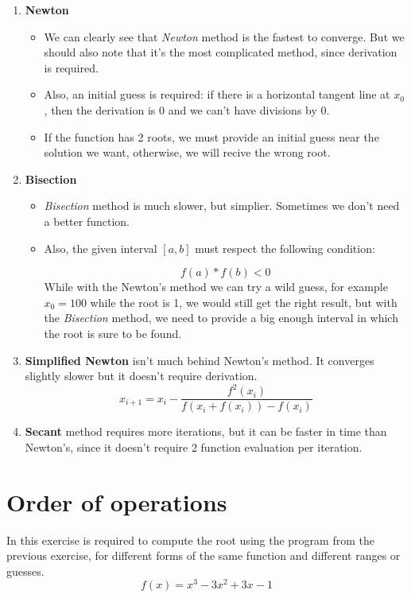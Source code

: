 \documentclass{article}
\begin{document}
		\begin{enumerate}
			\item \textbf{Newton}
				\begin{itemize}
					\item We can clearly see that \textit{Newton} method is the fastest to converge. But we should also note that it's the most complicated method, since derivation is required.

					\item Also, an initial guess is required: if there is a horizontal tangent line at $x_0$, then the derivation is 0 and we can't have divisions by 0.

					\item If the function has 2 roots, we must provide an initial guess near the solution we want, otherwise, we will recive the wrong root.
				\end{itemize}
			\item \textbf{Bisection}
				\begin{itemize}
					\item \textit{Bisection} method is much slower, but simplier. Sometimes we don't need a better function.

					\item Also, the given interval $[a, b]$ must respect the following condition: 

					\[f(a) * f(b) < 0\]
					While with the Newton's method we can try a wild guess, for example $x_0 = 100$ while the root is 1, we would still get the right result, but with the \textit{Bisection} method, we need to provide a big enough interval in which the root is sure to be found.
				\end{itemize}
			\item \textbf{Simplified Newton} isn't much behind Newton's method. It converges slightly slower but it doesn't require derivation.
			\[
				x_{i + 1} = x_i - \frac{f^2(x_i)}{f(x_i + f(x_i)) - f(x_i)}
			\]
			\item \textbf{Secant} method requires more iterations, but it can be faster in time than Newton's, since it doesn't require 2 function evaluation per iteration.
		\end{enumerate}

		\newpage
		\section{Order of operations}
			\par In this exercise is required to compute the root using the program from the previous exercise, for different forms of the same function and different ranges or guesses.
			\[
				f(x) = x^3 - 3x^2 + 3x - 1
			\]
\end{document}
